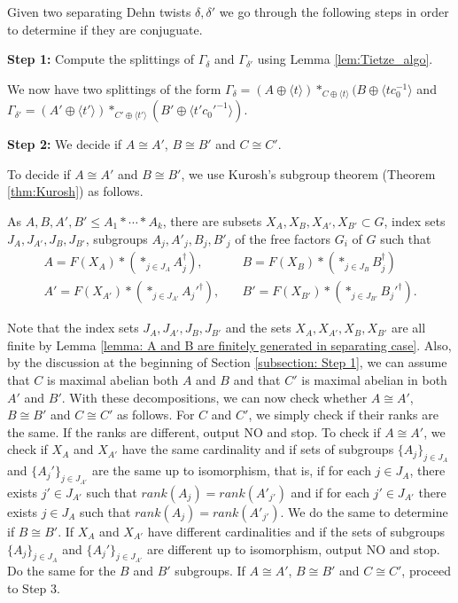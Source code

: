 \documentclass{amsart}
\theoremstyle{plain}
\theoremstyle{definition}
\theoremstyle{remark}
\begin{document}
    
Given two separating Dehn twists $\delta, \delta'$ we go through the following steps in order to determine if they are conjuguate.


\textbf{Step 1:} Compute the splittings of $\Gamma_\delta$ and $\Gamma_{\delta'}$ using Lemma \ref{lem:Tietze_algo}. 

We now have two splittings of the form $\Gamma_\delta= (A\oplus \langle t \rangle)*_{C \oplus \langle t \rangle} (B\oplus \langle tc_0^{-1} \rangle$ and $\Gamma_{\delta'}= (A'\oplus \langle t' \rangle)*_{C' \oplus \langle t' \rangle} (B'\oplus \langle t'c_0'^{-1} \rangle)$. 

\textbf{Step 2:} We decide if $A \cong A'$, $B \cong B'$ and  $C \cong C'$.

To decide if $A \cong A'$ and $B \cong B'$, we use Kurosh's subgroup theorem (Theorem \ref{thm:Kurosh}) as follows. 


As $A,B,A',B' \leq A_1 * \cdots *A_k$, there are subsets $X_{A}, X_B, X_{A'}, X_{B'} \subset G$, index sets $J_A, J_{A'}, J_B, J_{B'}$, subgroups $A_j, A'_j, B_j, B'_j$ of the free factors $G_i$ of $ G$ such that
\begin{align*} 
A=F(X_A) * (*_{j \in J_A} A_j^{\dag}),\quad & B=F(X_B) * (*_{j \in J_B} B_j^{\dag}) \\ 
   A'=F(X_{A'}) * (*_{j \in J_{A'}} A_j'^{\dag}),\quad & B'=F(X_{B'}) * (*_{j \in J_{B'}} B_j'^{\dag}).
\end{align*}

Note that the index sets $J_A,J_{A'}, J_B, J_{B'}$ and the sets $X_A, X_{A'}, X_B, X_{B'}$ are all finite by Lemma \ref{lemma: A and B are finitely generated in separating case}. Also, by the discussion at the beginning of Section \ref{subsection: Step 1}, we can assume that $C$ is maximal abelian both $A$ and $B$ and that $C'$ is maximal abelian in both $A'$ and $B'$. With these decompositions, we can now check whether $A \cong A'$, $B \cong B'$ and $C \cong C'$ as follows. For $C$ and $C'$, we simply check if their ranks are the same. If the ranks are different, output NO and stop. To check if $A \cong A'$, we check if $X_A$ and $X_{A'}$ have the same cardinality and if sets of subgroups $\{A_j\}_{j \in J_A}$ and $\{A_j'\}_{j \in J_{A'}}$ are the same up to isomorphism, that is, if for each $j \in J_A$, there exists $j' \in J_{A'}$ such that $rank (A_j) = rank (A'_{j'})$ and if for each $j' \in J_{A'}$ there exists $j \in J_A$ such that $rank (A_j) = rank (A'_{j'})$. We do the same to determine if $B \cong B'$. If $X_A$ and $X_{A'}$ have different cardinalities and if the sets of subgroups $\{A_j\}_{j \in J_A}$ and $\{A_j'\}_{j \in J_{A'}}$ are different up to isomorphism, output NO and stop. Do the same for the $B$ and $B'$ subgroups. If $A \cong A'$, $B \cong B'$ and $C \cong C'$, proceed to Step 3. 
\end{document}

